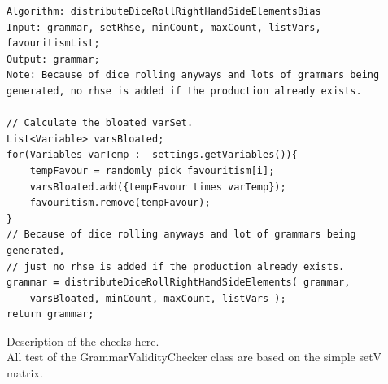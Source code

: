 \lstset{language=java}
\begin{lstlisting}[frame=htrbl,caption={distributeDiceRollRightHandSideElementsBias}, 
label={lst:distributeDiceRollRightHandSideElementsBias}]
Algorithm: distributeDiceRollRightHandSideElementsBias
Input: grammar, setRhse, minCount, maxCount, listVars, favouritismList;
Output: grammar;
Note: Because of dice rolling anyways and lots of grammars being 
generated, no rhse is added if the production already exists.

// Calculate the bloated varSet.
List<Variable> varsBloated;
for(Variables varTemp :  settings.getVariables()){
	tempFavour = randomly pick favouritism[i];
	varsBloated.add({tempFavour times varTemp});
	favouritism.remove(tempFavour);
}
// Because of dice rolling anyways and lot of grammars being generated, 
// just no rhse is added if the production already exists.
grammar = distributeDiceRollRightHandSideElements( grammar,
	varsBloated, minCount, maxCount, listVars );
return grammar;
\end{lstlisting}


\pagebreak
\noindent Description of the checks here. \\
\noindent All test of the GrammarValidityChecker class are based on the simple setV matrix. \\

